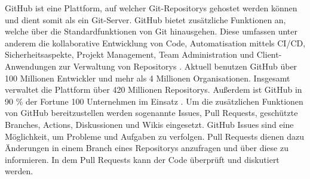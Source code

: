 GitHub ist eine Plattform, auf welcher Git-Repositorys gehostet werden können und dient somit als ein Git-Server.
GitHub bietet zusätzliche Funktionen an, welche über die Standardfunktionen von Git hinausgehen.
Diese umfassen unter anderem die kollaborative Entwicklung von Code, Automatisation mittels CI/CD, Sicherheitsaspekte, Projekt Management, Team Administration und Client-Anwendungen zur Verwaltung von Repositorys \autocite{ponuthorai_version_2022}.
Aktuell benutzen GitHub über 100 Millionen Entwickler und mehr als 4 Millionen Organisationen.
Insgesamt verwaltet die Plattform über 420 Millionen Repositorys.
Außerdem ist GitHub in 90 \% der Fortune 100 Unternehmen im Einsatz \autocite{github_about_2024}.
Um die zusätzlichen Funktionen von GitHub bereitzustellen werden sogenannte Issues, Pull Requests, geschützte Branches, Actions, Diskussionen und Wikis eingesetzt.
GitHub Issues sind eine Möglichkeit, um Probleme und Aufgaben zu verfolgen.
Pull Requests dienen dazu Änderungen in einem Branch eines Repositorys anzufragen und über diese zu informieren.
In dem Pull Requests kann der Code überprüft und diskutiert werden.
